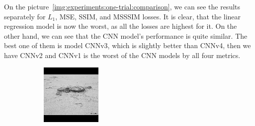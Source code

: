On the picture~\ref{img:experiments:one-trial:comparison}, we can see the results separately for $L_1$, MSE, SSIM, and MSSSIM losses. It is clear, that the linear regression model is now the worst, as all the losses are highest for it. On the other hand, we can see that the CNN model's performance is quite similar. The best one of them is model CNNv3, which is slightly better than CNNv4, then we have CNNv2 and CNNv1 is the worst of the CNN models by all four metrics.

\begin{figure}[H]\centering

  \begin{subfigure}[t]{0.15\textwidth}
    \centering
    \includegraphics[width=\linewidth]{img/one-trial/stimulus_1.png}
  \end{subfigure}
  \begin{subfigure}[t]{0.15\textwidth}
    \centering

\end{subfigure}
\end{figure}
